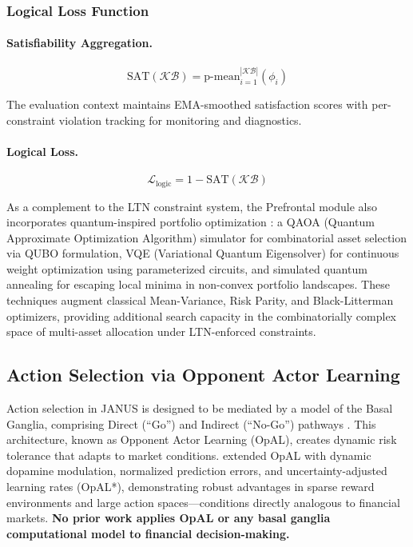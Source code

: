 \documentclass[12pt, a4paper]{article}
\begin{document}
\subsubsection{Logical Loss Function}

\paragraph{Satisfiability Aggregation.}
\begin{equation}
	\text{SAT}(\mathcal{KB}) = \text{p-mean}_{i=1}^{|\mathcal{KB}|}(\phi_i)
	\label{eq:sat}
\end{equation}

The evaluation context maintains EMA-smoothed satisfaction scores with per-constraint violation tracking for monitoring and diagnostics.

\paragraph{Logical Loss.}
\begin{equation}
	\mathcal{L}_{\text{logic}} = 1 - \text{SAT}(\mathcal{KB})
	\label{eq:logic_loss}
\end{equation}

\medskip

As a complement to the LTN constraint system, the Prefrontal module also incorporates quantum-inspired portfolio optimization \citep{mugel2022dynamic}: a QAOA (Quantum Approximate Optimization Algorithm) simulator for combinatorial asset selection via QUBO formulation, VQE (Variational Quantum Eigensolver) for continuous weight optimization using parameterized circuits, and simulated quantum annealing for escaping local minima in non-convex portfolio landscapes.
These techniques augment classical Mean-Variance, Risk Parity, and Black-Litterman optimizers, providing additional search capacity in the combinatorially complex space of multi-asset allocation under LTN-enforced constraints.

\subsection{Action Selection via Opponent Actor Learning}
\label{sec:basal_ganglia}

Action selection in JANUS is designed to be mediated by a model of the Basal Ganglia, comprising Direct (``Go'') and Indirect (``No-Go'') pathways \citep{collins2014opponent, foster2013hierarchical}. This architecture, known as Opponent Actor Learning (OpAL), creates dynamic risk tolerance that adapts to market conditions.
\citet{jaskir2023opal} extended OpAL with dynamic dopamine modulation, normalized prediction errors, and uncertainty-adjusted learning rates (OpAL*), demonstrating robust advantages in sparse reward environments and large action spaces---conditions directly analogous to financial markets.
\textbf{No prior work applies OpAL or any basal ganglia computational model to financial decision-making.}
\end{document}
